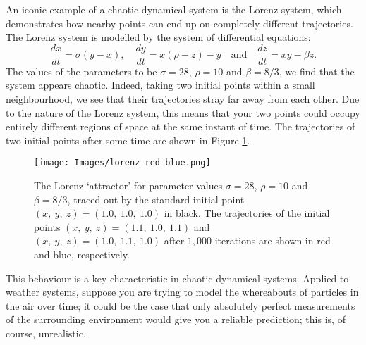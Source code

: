 \begin{exmp}
    An iconic example of a chaotic dynamical system is the Lorenz system, which demonstrates how nearby points can end up on completely different trajectories. The Lorenz system is modelled by the system of differential equations:
    $$\frac{dx}{dt} = \sigma (y-x), \quad \frac{dy}{dt} = x(\rho -z)-y \quad\text{and} \quad \frac{dz}{dt} = xy-\beta z.$$
The values of the parameters to be $\sigma=28$, $\rho=10$ and $\beta=8/3$, we find that the system appears chaotic. Indeed, taking two initial points within a small neighbourhood, we see that their trajectories stray far away from each other. Due to the nature of the Lorenz system, this means that your two points could occupy entirely different regions of space at the same instant of time. The trajectories of two initial points after some time are shown in Figure \ref{fig:lorenzrb}.
\begin{figure}
    \centering
    \texttt{[image: Images/lorenz red blue.png]}
    \caption{The Lorenz `attractor' for parameter values $\sigma=28$, $\rho=10$ and $\beta=8/3$, traced out by the standard initial point $(x,\ y,\ z)=(1.0,\ 1.0,\ 1.0)$ in black. The trajectories of the initial points $(x,\ y,\ z)=(1.1,\ 1.0,\ 1.1)$ and $(x,\ y,\ z)=(1.0,\ 1.1,\ 1.0)$ after $1,000$ iterations are shown in red and blue, respectively.}
    \label{fig:lorenzrb}
\end{figure}
This behaviour is a key characteristic in chaotic dynamical systems. Applied to weather systems, suppose you are trying to model the whereabouts of particles in the air over time; it could be the case that only absolutely perfect measurements of the surrounding environment would give you a reliable prediction; this is, of course, unrealistic.
\end{exmp}
